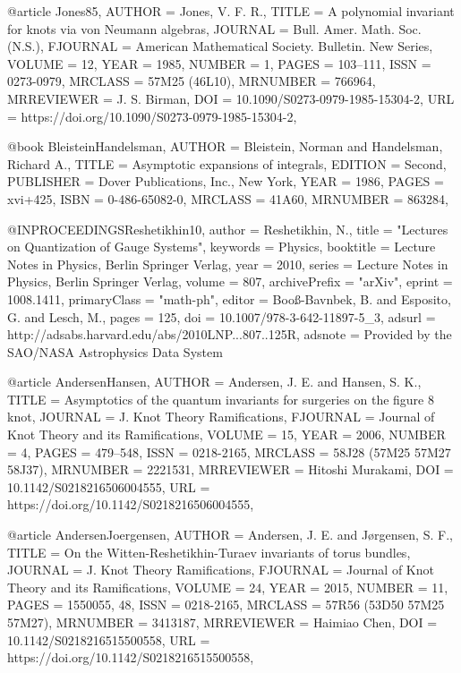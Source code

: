 @article {Jones85,
    AUTHOR = {Jones, V. F. R.},
     TITLE = {A polynomial invariant for knots via von {N}eumann algebras},
   JOURNAL = {Bull. Amer. Math. Soc. (N.S.)},
  FJOURNAL = {American Mathematical Society. Bulletin. New Series},
    VOLUME = {12},
      YEAR = {1985},
    NUMBER = {1},
     PAGES = {103--111},
      ISSN = {0273-0979},
   MRCLASS = {57M25 (46L10)},
  MRNUMBER = {766964},
MRREVIEWER = {J. S. Birman},
       DOI = {10.1090/S0273-0979-1985-15304-2},
       URL = {https://doi.org/10.1090/S0273-0979-1985-15304-2},
}

@book {BleisteinHandelsman,
    AUTHOR = {Bleistein, Norman and Handelsman, Richard A.},
     TITLE = {Asymptotic expansions of integrals},
   EDITION = {Second},
 PUBLISHER = {Dover Publications, Inc., New York},
      YEAR = {1986},
     PAGES = {xvi+425},
      ISBN = {0-486-65082-0},
   MRCLASS = {41A60},
  MRNUMBER = {863284},
}

@INPROCEEDINGS{Reshetikhin10,
   author = {{Reshetikhin}, N.},
    title = "{Lectures on Quantization of Gauge Systems}",
 keywords = {Physics},
booktitle = {Lecture Notes in Physics, Berlin Springer Verlag},
     year = 2010,
   series = {Lecture Notes in Physics, Berlin Springer Verlag},
   volume = 807,
archivePrefix = "arXiv",
   eprint = {1008.1411},
 primaryClass = "math-ph",
   editor = {{Boo{\ss}-Bavnbek}, B. and {Esposito}, G. and {Lesch}, M.},
    pages = {125},
      doi = {10.1007/978-3-642-11897-5_3},
   adsurl = {http://adsabs.harvard.edu/abs/2010LNP...807..125R},
  adsnote = {Provided by the SAO/NASA Astrophysics Data System}
}

@article {AndersenHansen,
    AUTHOR = {Andersen, J. E. and Hansen, S. K.},
     TITLE = {Asymptotics of the quantum invariants for surgeries on the
              figure 8 knot},
   JOURNAL = {J. Knot Theory Ramifications},
  FJOURNAL = {Journal of Knot Theory and its Ramifications},
    VOLUME = {15},
      YEAR = {2006},
    NUMBER = {4},
     PAGES = {479--548},
      ISSN = {0218-2165},
   MRCLASS = {58J28 (57M25 57M27 58J37)},
  MRNUMBER = {2221531},
MRREVIEWER = {Hitoshi Murakami},
       DOI = {10.1142/S0218216506004555},
       URL = {https://doi.org/10.1142/S0218216506004555},
}

@article {AndersenJoergensen,
    AUTHOR = {Andersen, J. E. and J\o rgensen, S. F.},
     TITLE = {On the {W}itten-{R}eshetikhin-{T}uraev invariants of torus
              bundles},
   JOURNAL = {J. Knot Theory Ramifications},
  FJOURNAL = {Journal of Knot Theory and its Ramifications},
    VOLUME = {24},
      YEAR = {2015},
    NUMBER = {11},
     PAGES = {1550055, 48},
      ISSN = {0218-2165},
   MRCLASS = {57R56 (53D50 57M25 57M27)},
  MRNUMBER = {3413187},
MRREVIEWER = {Haimiao Chen},
       DOI = {10.1142/S0218216515500558},
       URL = {https://doi.org/10.1142/S0218216515500558},
}

